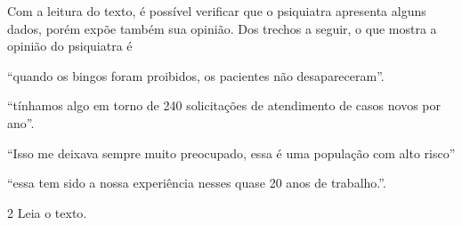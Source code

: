 Com a leitura do texto, é possível verificar que o psiquiatra apresenta
alguns dados, porém expõe também sua opinião. Dos trechos a seguir, o
que mostra a opinião do psiquiatra é

\begin{escolha}
\item
  ``quando os bingos foram proibidos, os pacientes não desapareceram''.
\item
  ``tínhamos algo em torno de 240 solicitações de atendimento de casos
  novos por ano''.
\item
  ``Isso me deixava sempre muito preocupado, essa é uma população com
  alto risco''
\item
  ``essa tem sido a nossa experiência nesses quase 20 anos de
  trabalho.''.
\end{escolha}


\num{2} Leia o texto.

